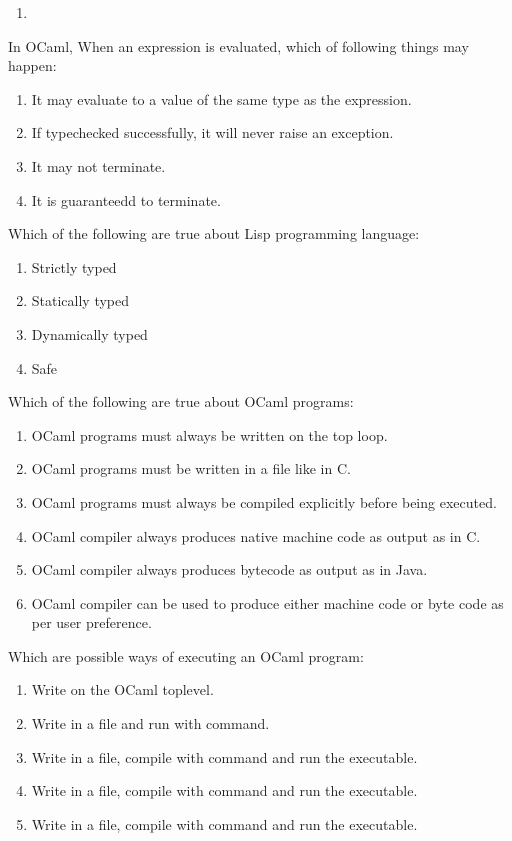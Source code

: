 \documentclass[addpoints,11pt]{exam}
\begin{document}
\begin{questions}
\begin{enumerate}
\item \lstinline@lnot@
\end{enumerate}
\question In OCaml, When an expression is evaluated, which of following things may happen:
\begin{enumerate}
\item It may evaluate to a value of the same type as the expression.
\item If typechecked successfully, it will never raise an exception.
\item It may not terminate.
\item It is guaranteedd to terminate.
\end{enumerate}
\question Which of the following are true about Lisp programming language:
\begin{enumerate}
\item Strictly typed
\item Statically typed
\item Dynamically typed
\item Safe
\end{enumerate}\question Which of the following are true about OCaml programs:
\begin{enumerate}
\item OCaml programs must always be written on the top loop.
\item OCaml programs must be written in a file like in C.
\item OCaml programs must always be compiled explicitly before being executed.
\item OCaml compiler always produces native machine code as output as in C.
\item OCaml compiler always produces bytecode as output as in Java.
\item OCaml compiler can be used to produce either machine code or byte code as per user preference.
\end{enumerate}\question Which are possible ways of executing an OCaml program:
\begin{enumerate}
\item Write on the OCaml toplevel.
\item Write in a file and run with \lstinline@ocaml@ command.
\item Write in a file, compile with \lstinline@ocamlc@ command and run the executable.
\item Write in a file, compile with \lstinline@ocamlopt@ command and run the executable.
\item Write in a file, compile with \lstinline@ocamlcom@ command and run the executable.

\end{enumerate}
\end{questions}
\end{document}
